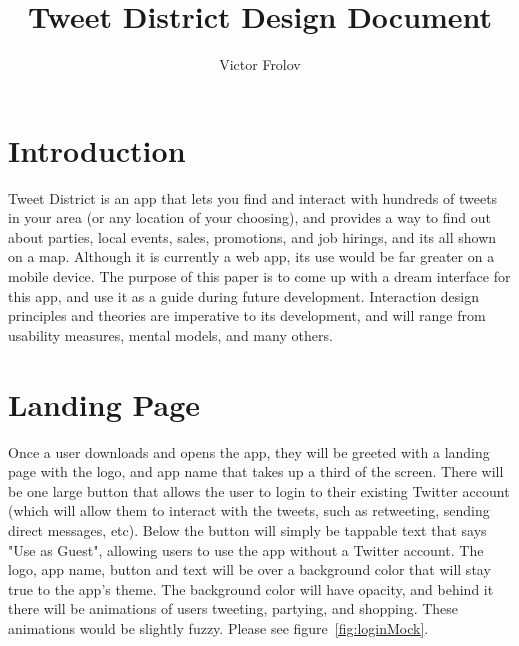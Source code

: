 \documentclass[11pt]{article}
\title{Tweet District Design Document}
\author{Victor Frolov}
\begin{document}
\maketitle

\section{Introduction}
Tweet District is an app that lets you find and interact with hundreds of tweets in your area (or any location of your choosing), and provides a way to find out about parties, local events, sales, promotions, and job hirings, and its all shown on a map. Although it is currently a web app, its use would be far greater on a mobile device. The purpose of this paper is to come up with a dream interface for this app, and use it as a guide during future development. Interaction design principles and theories are imperative to its development, and will range from usability measures, mental models, and many others.


\section{Landing Page}
Once a user downloads and opens the app, they will be greeted with a landing page with the logo, and app name that takes up a third of the screen. There will be one large button that allows the user to login to their existing Twitter account (which will allow them to interact with the tweets, such as retweeting, sending direct messages, etc). Below the button will simply be tappable text that says "Use as Guest", allowing users to use the app without a Twitter account. The logo, app name, button and text will be over a background color that will stay true to the app's theme. The background color will have opacity, and behind it there will be animations of users tweeting, partying, and shopping. These animations would be slightly fuzzy. Please see figure~\ref{fig:loginMock}.
\end{document}
